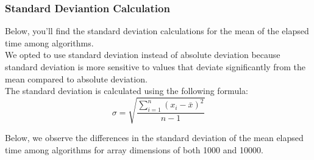\documentclass{article}
\begin{document}
\subsubsection{Standard Deviantion Calculation}

Below, you'll find the standard deviation calculations for the mean of the elapsed time among algorithms.\\

We opted to use standard deviation instead of absolute deviation because standard deviation is more sensitive to values that deviate significantly from the mean compared to absolute deviation.\\

The standard deviation is calculated using the following formula:
\[ \sigma = \sqrt{\frac{\sum_{i=1}^{n}(x_i - \bar{x})^2}{n-1}} \]

Below, we observe the differences in the standard deviation of the mean elapsed time among algorithms for array dimensions of both 1000 and 10000.\\
\end{document}
